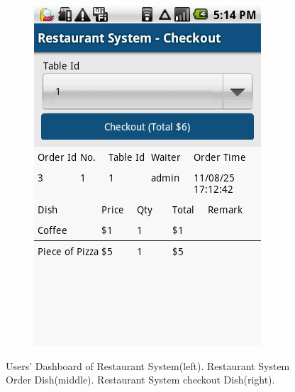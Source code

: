 \begin{enumerate}
\begin{figure}[h!t]
{\begin{subfigure}[b]{.33\textwidth}
{  \includegraphics[width=0.9\linewidth]{ch2/RelatedApps/RestaurantSystem/3.png}
  }
\end{subfigure}
}
\caption{Users' Dashboard of Restaurant System(left). Restaurant System Order Dish(middle).  Restaurant System checkout Dish(right).}
\label{fig:RestaurantSystem}
\end{figure}

\end{enumerate}

